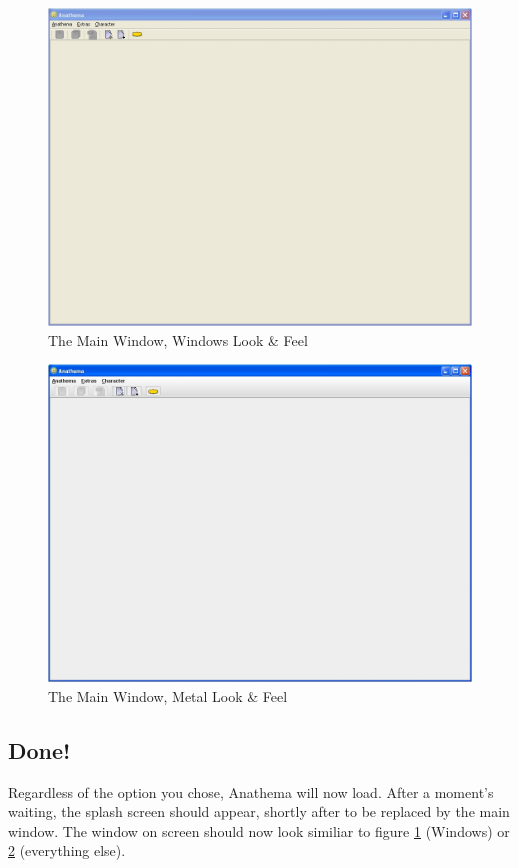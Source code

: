 \begin{figure}[htb]
	\centering
		\includegraphics[width=1.00\textwidth]{Images/MainWindow.jpg}
	\caption{The Main Window, Windows Look \& Feel}
	\label{fig:MainWindow}
\end{figure}

\begin{figure}[htb]
	\centering
		\includegraphics[width=1.00\textwidth]{Images/MainWindowMetal.jpg}
	\caption{The Main Window, Metal Look \& Feel}
	\label{fig:MainWindowMetal}
\end{figure}

\subsection{Done!}
Regardless of the option you chose, Anathema will now load. After a moment's waiting, the splash screen should appear, shortly after to be replaced by the main window. The window on screen should now look similiar to figure \ref{fig:MainWindow} (Windows) or \ref{fig:MainWindowMetal} (everything else).

